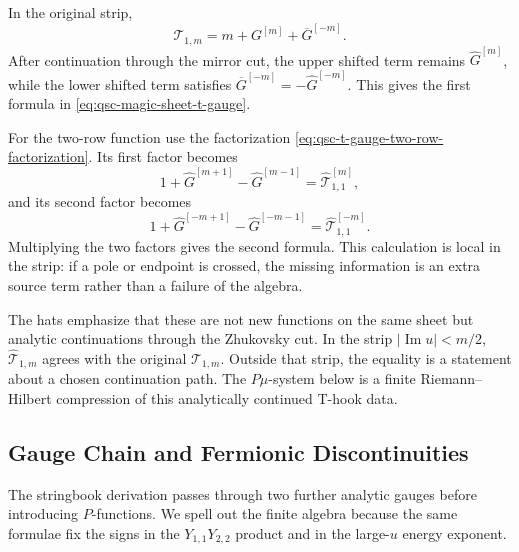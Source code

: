 In the original strip,
\[
  \mathcal T_{1,m}=m+G^{[m]}+\overline G^{[-m]} .
\]
After continuation through the mirror cut, the upper shifted term remains
\(\widehat G^{[m]}\), while the lower shifted term satisfies
\(\overline G^{[-m]}=-\widehat G^{[-m]}\).  This gives the first formula in
\eqref{eq:qsc-magic-sheet-t-gauge}.

For the two-row function use
the factorization \eqref{eq:qsc-t-gauge-two-row-factorization}.  Its first factor
becomes
\[
  1+\widehat G^{[m+1]}-\widehat G^{[m-1]}
  =
  \widehat{\mathcal T}_{1,1}^{[m]},
\]
and its second factor becomes
\[
  1+\widehat G^{[-m+1]}-\widehat G^{[-m-1]}
  =
  \widehat{\mathcal T}_{1,1}^{[-m]}.
\]
Multiplying the two factors gives the second formula.  This calculation is local in
the strip: if a pole or endpoint is crossed, the missing information is an
extra source term rather than a failure of the algebra.

The hats emphasize that these are not new functions on the same sheet but
analytic continuations through the Zhukovsky cut.  In the strip
\(|\operatorname{Im}u|<m/2\), \(\widehat{\mathcal T}_{1,m}\) agrees with the
original \(\mathcal T_{1,m}\).  Outside that strip, the equality is a statement
about a chosen continuation path.  The \(P\mu\)-system below is a finite
Riemann--Hilbert compression of this analytically continued T-hook data.

\subsection{Gauge Chain and Fermionic Discontinuities}

The stringbook derivation passes through two further analytic gauges before
introducing \(P\)-functions.  We spell out the finite algebra because the
same formulae fix the signs in the \(Y_{1,1}Y_{2,2}\) product and in the
large-\(u\) energy exponent.

